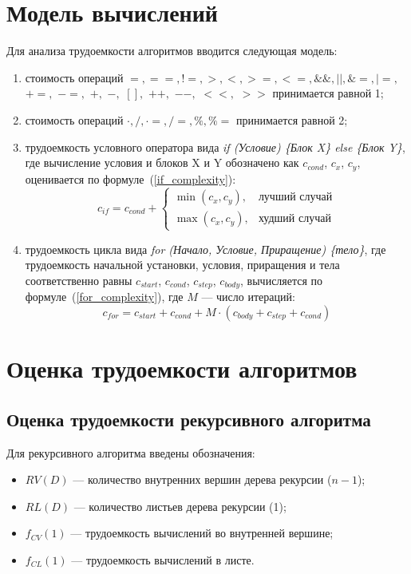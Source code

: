 \section{Модель вычислений}

Для анализа трудоемкости алгоритмов вводится следующая модель:
\begin{enumerate}
	\item стоимость операций $=, ==, !=, >, <, >=, <=, \&\&, ||, \&=, |=,$ $+=,$ $-=,$ $+,$ $-,$ $[],$ $ ++,$ $--,$ $<<,$ $>>$ принимается равной 1;
	\item стоимость операций $\cdot, /, \cdot=, /=, \%, \%=$ принимается равной 2;
	\item трудоемкость условного оператора вида \textit{if (Условие) \{Блок X\} else \{Блок Y\}}, где вычисление условия и блоков X и Y обозначено как $c_{cond}$, $c_x$, $c_y$, оценивается по формуле~(\ref{if_complexity}):
	\begin{equation}
		\label{if_complexity}
		c_{if} = c_{cond} + 
		\begin{cases}
			\min(c_x, c_y), & \text{лучший случай} \\
			\max(c_x, c_y), & \text{худший случай}
		\end{cases}
	\end{equation}
	\item трудоемкость цикла вида \textit{for (Начало, Условие, Приращение) \{тело\}}, 
	где трудоемкость начальной установки, условия, приращения и тела соответственно 
	равны $c_{start}$, $c_{cond}$, $c_{step}$, $c_{body}$, вычисляется по 
	формуле~(\ref{for_complexity}), где $M$ --- число итераций:
	\begin{equation}
		\label{for_complexity}
		c_{for} = c_{start} + c_{cond} + M \cdot (c_{body} + c_{step} + c_{cond})
	\end{equation}
\end{enumerate}


\section{Оценка трудоемкости алгоритмов}
\subsection{Оценка трудоемкости рекурсивного алгоритма}

Для рекурсивного алгоритма введены обозначения:
\begin{itemize}
	\item $RV(D)$ — количество внутренних вершин дерева рекурсии ($n - 1$);
	\item $RL(D)$ — количество листьев дерева рекурсии (1);
	\item $f_{CV}(1)$ — трудоемкость вычислений во внутренней вершине;
	\item $f_{CL}(1)$ — трудоемкость вычислений в листе.
\end{itemize}

